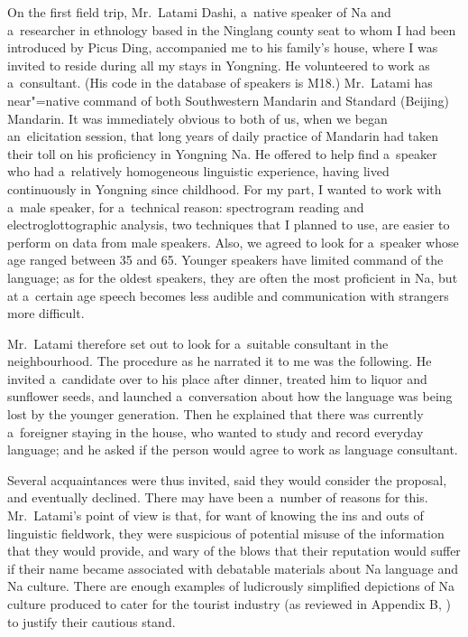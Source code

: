 On the first field trip, Mr.\ Latami Dashi, a~native speaker of Na and a~researcher in ethnology
based in the Ninglang county seat to whom I had been introduced by Picus Ding, accompanied me to his
family’s house, where I was invited to reside during all my stays in Yongning. He volunteered to
work as a~consultant. (His code in the database of  speakers is M18.) Mr.\ Latami has near"=native
command of both Southwestern {Mandarin} and Standard (Beijing) Mandarin. It was immediately obvious to both of
us, when we began an~elicitation session, that long years of daily practice of {Mandarin} had taken
their toll on his proficiency in Yongning Na. He offered to help find a~speaker who had a~relatively homogeneous
linguistic experience, having lived continuously in Yongning since childhood. For my part, I wanted
to work with a~male speaker, for a~technical reason: spectrogram reading and electroglottographic
analysis, two techniques that I planned to use, are easier to perform on data from male
speakers. Also, we agreed to look for a~speaker whose age ranged between 35 and 65. Younger speakers
have limited command of the language; as for the oldest speakers, they are often the most proficient in
Na, but at a~certain age speech becomes less audible and communication with strangers more
difficult.

Mr.\ Latami therefore set out to look for a~suitable consultant in the neighbourhood. The procedure
as he narrated it to me was the following. He invited a~candidate over to his place after dinner,
treated him to liquor and sunflower seeds, and launched a~conversation about how the language was
being lost by the younger generation. Then he explained that there was currently a~foreigner staying
in the house, who wanted to study and record everyday language; and he asked if the person would
agree to work as language consultant.

Several acquaintances were thus invited, said they would consider the proposal, and eventually
declined. There may have been a~number of reasons for this. Mr.\ Latami’s point of view is that, for
want of knowing the ins and outs of linguistic fieldwork, they were suspicious of potential misuse
of the information that they would provide, and wary of the blows that their reputation would suffer
if their name became associated with debatable materials about Na language and Na culture. There are
enough examples of ludicrously simplified depictions of Na culture produced to cater for the tourist
industry (as reviewed in Appendix B, ) to justify their
cautious stand.

